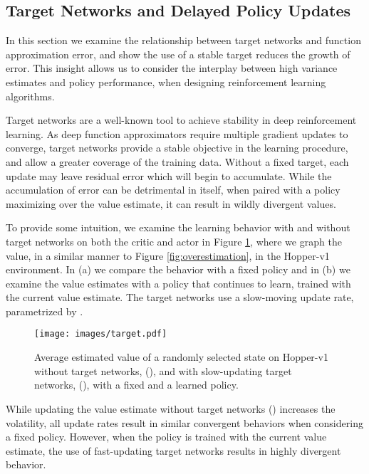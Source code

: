 \documentclass{article}
\begin{document}
\subsection{Target Networks and Delayed Policy Updates} \label{sec:dp}


In this section we examine the relationship between target networks and function approximation error, and show the use of a stable target reduces the growth of error. This insight allows us to consider the interplay between high variance estimates and policy performance, when designing reinforcement learning algorithms. 
 
Target networks are a well-known tool to achieve stability in deep reinforcement learning. As deep function approximators require multiple gradient updates to converge, target networks provide a stable objective in the learning procedure, and allow a greater coverage of the training data. Without a fixed target, each update may leave residual error which will begin to accumulate. While the accumulation of error can be detrimental in itself, when paired with a policy maximizing over the value estimate, it can result in wildly divergent values. 

To provide some intuition, we examine the learning behavior with and without target networks on both the critic and actor in Figure \ref{fig:target}, where we graph the value, in a similar manner to Figure \ref{fig:overestimation}, in the Hopper-v1 environment. In (a) we compare the behavior with a fixed policy and in (b) we examine the value estimates with a policy that continues to learn, trained with the current value estimate. The target networks use a slow-moving update rate, parametrized by . 

\begin{figure} 
\centering
\captionsetup[subfloat]{captionskip=-8pt}
\texttt{[image: images/target.pdf]}
\caption{Average estimated value of a randomly selected state on Hopper-v1 without target networks, (), and with slow-updating target networks, (), with a fixed and a learned policy.}
\label{fig:target}
\end{figure}

While updating the value estimate without target networks () increases the volatility, all update rates result in similar convergent behaviors when considering a fixed policy. However, when the policy is trained with the current value estimate, the use of fast-updating target networks results in highly divergent behavior. 
\end{document}
